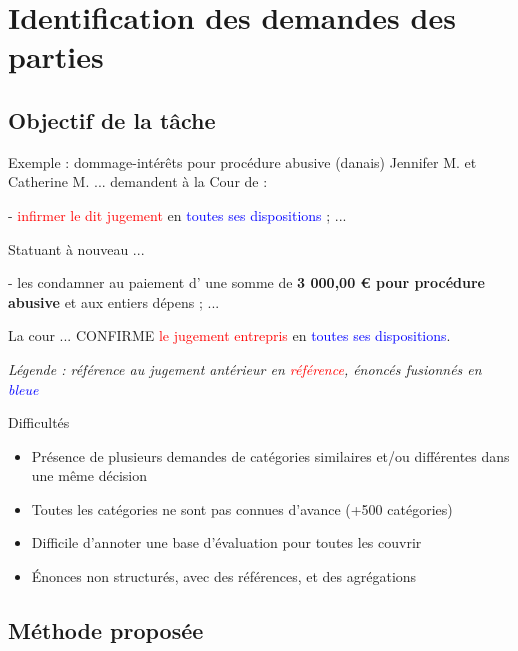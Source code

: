 \section{Identification des demandes des parties}
\subsection{Objectif de la tâche}
\begin{frame}[t]{\mysubsectiontitle}
\begin{exampleblock}{\scriptsize Exemple : dommage-intérêts pour procédure abusive (danais)}
	\scriptsize
	Jennifer M. et Catherine M. ... demandent à la Cour de :
	
	- \textcolor{red}{infirmer le dit jugement} en \textcolor{blue}{toutes ses dispositions} ; 
	...
	
	Statuant à nouveau ...
	
	- les condamner au paiement d' une somme de  \textbf{3 000,00 \euro{} pour procédure abusive} et
	aux entiers dépens ; ...
	
	La cour ... CONFIRME \textcolor{red}{le jugement entrepris} en \textcolor{blue}{toutes ses dispositions}.			
	
	{\tiny \it Légende : référence au jugement antérieur en \textcolor{red}{référence}, énoncés fusionnés en \textcolor{blue}{bleue}}
	
\end{exampleblock}

\begin{alertblock}{\scriptsize Difficultés}
	\begin{itemize}\scriptsize 
		\item Présence de plusieurs demandes de catégories similaires et/ou différentes dans une même décision
		\item Toutes les catégories ne sont pas connues d'avance (+500 catégories)
		\item Difficile d'annoter une base d'évaluation pour toutes les couvrir
		\item Énonces non structurés, avec des références, et des agrégations
	\end{itemize}
\end{alertblock}
\end{frame}

\subsection{Méthode proposée}

